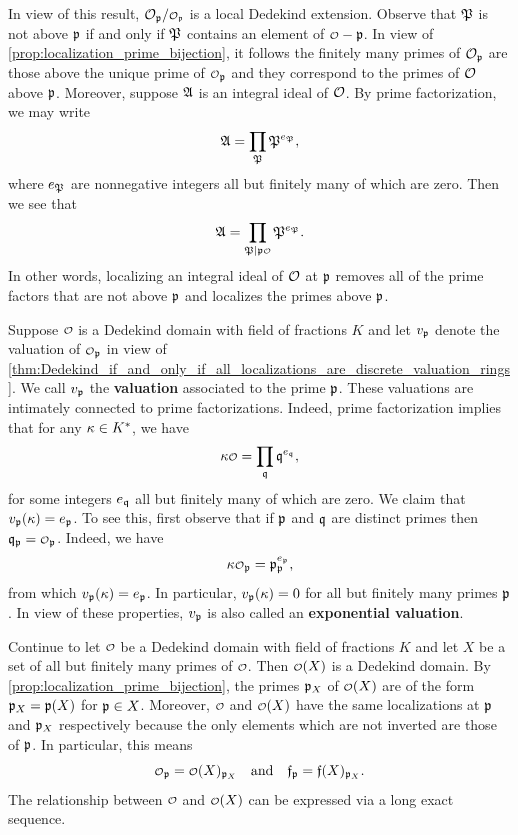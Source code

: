     In view of this result, \(\mc{O}_{\mf{p}}/\smc{O_{\mf{p}}}\) is a local Dedekind extension. Observe that \(\mathfrak{P}\) is not above \(\mathfrak{p}\) if and only if \(\mathfrak{P}\) contains an element of \(\smc{O}-\mf{p}\). In view of \cref{prop:localization_prime_bijection}, it follows the finitely many primes of \(\mathcal{O}_{\mathfrak{p}}\) are those above the unique prime of \(\smc{O}_{\mf{p}}\) and they correspond to the primes of \(\mathcal{O}\) above \(\mathfrak{p}\). Moreover, suppose \(\mathfrak{A}\) is an integral ideal of \(\mathcal{O}\). By prime factorization, we may write
    \[
      \mathfrak{A} = \prod_{\mathfrak{P}}\mathfrak{P}^{e_{\mathfrak{P}}},
    \]
    where \(e_{\mathfrak{P}}\) are nonnegative integers all but finitely many of which are zero. Then we see that
    \[
      \mf{A} = \prod_{\mf{P} \mid \mf{p}\smc{O}}\mf{P}^{e_{\mf{P}}}.
    \]
    In other words, localizing an integral ideal of \(\mathcal{O}\) at \(\mathfrak{p}\) removes all of the prime factors that are not above \(\mathfrak{p}\) and localizes the primes above \(\mathfrak{p}\).

    Suppose \(\smc{O}\) is a Dedekind domain with field of fractions \(K\) and let \(v_{\mathfrak{p}}\) denote the valuation of \(\smc{O}_{\mf{p}}\) in view of \cref{thm:Dedekind_if_and_only_if_all_localizations_are_discrete_valuation_rings}. We call \(v_{\mathfrak{p}}\) the \textbf{valuation} associated to the prime \(\mathfrak{p}\). These valuations are intimately connected to prime factorizations. Indeed, prime factorization implies that for any \(\kappa \in K^{\ast}\), we have
    \[
      \k\smc{O} = \prod_{\mf{q}}\mf{q}^{e_{\mf{q}}},
    \]
    for some integers \(e_{\mathfrak{q}}\) all but finitely many of which are zero. We claim that \(v_{\mathfrak{p}}(\kappa) = e_{\mathfrak{p}}\). To see this, first observe that if \(\mathfrak{p}\) and \(\mathfrak{q}\) are distinct primes then \(\mf{q}_{\mf{p}} = \smc{O}_{\mf{p}}\). Indeed, we have
    \[
      \k\smc{O}_{\mf{p}} = \mf{p}_{\mf{p}}^{e_{\mf{p}}},
    \]
    from which \(v_{\mathfrak{p}}(\kappa) = e_{\mathfrak{p}}\). In particular, \(v_{\mathfrak{p}}(\kappa) = 0\) for all but finitely many primes \(\mathfrak{p}\). In view of these properties, \(v_{\mathfrak{p}}\) is also called an \textbf{exponential valuation}.

    Continue to let \(\smc{O}\) be a Dedekind domain with field of fractions \(K\) and let \(X\) be a set of all but finitely many primes of \(\smc{O}\). Then \(\smc{O}(X)\) is a Dedekind domain. By \cref{prop:localization_prime_bijection}, the primes \(\mathfrak{p}_{X}\) of \(\smc{O}(X)\) are of the form \(\mathfrak{p}_{X} = \mathfrak{p}(X)\) for \(\mathfrak{p} \in X\). Moreover, \(\smc{O}\) and \(\smc{O}(X)\) have the same localizations at \(\mathfrak{p}\) and \(\mathfrak{p}_{X}\) respectively because the only elements which are not inverted are those of \(\mathfrak{p}\). In particular, this means
    \begin{equation}\label{equ:localizing_at_primes_for_X_is_the_same_as_localizing_at_primes} 
      \smc{O}_{\mf{p}} = \smc{O}(X)_{\mf{p}_{X}} \quad \text{and} \quad \mf{f}_{\mf{p}} = \mf{f}(X)_{\mf{p}_{X}}.
    \end{equation}
    The relationship between \(\smc{O}\) and \(\smc{O}(X)\) can be expressed via a long exact sequence.

